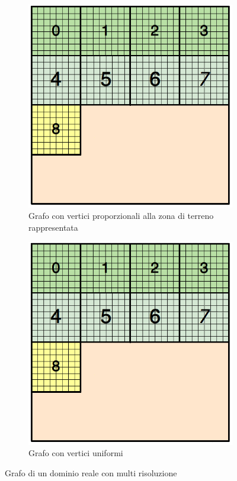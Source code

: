 \begin{figure}[H]
	\centering
	\begin{subfigure}{1.0\textwidth}
		\centering
		\includegraphics[width=1.0\linewidth]{immagini/block_on_grid.png}
		\caption{Grafo con vertici proporzionali alla zona di terreno rappresentata\newline}
		\label{fig:graph_multi}
	\end{subfigure}
	\begin{subfigure}{1.0\textwidth}
		\centering
		\includegraphics[width=1.0\linewidth]{immagini/block_on_grid.png}
		\caption{Grafo con vertici uniformi}
		\label{fig:graph_multi_equiv}
	\end{subfigure}
	\caption{Grafo di un dominio reale con multi risoluzione}
	\label{fig:domain_graph_multi}
\end{figure}

